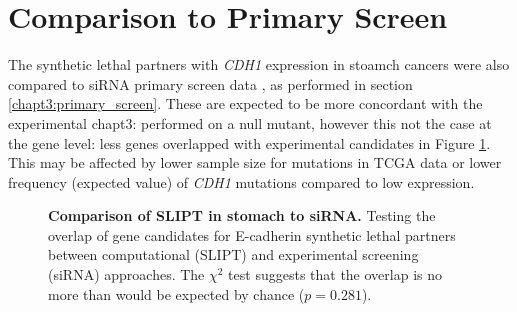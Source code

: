 
\FloatBarrier

\section{Comparison to Primary Screen} \label{appendix:compare_exprSL_genes_stad}

The synthetic lethal partners with \textit{CDH1} expression in stoamch cancers were also compared to siRNA primary screen data \citep{Telford2015}, as performed in section \ref{chapt3:primary_screen}. These are expected to be more concordant with the experimental chapt3: performed on a null mutant, however this not the case at the gene level: less genes overlapped with experimental candidates in Figure \ref{fig:Venn_allgenes_stad}. This may be affected by lower sample size for mutations in TCGA data or lower frequency (expected value) of \textit{CDH1} mutations compared to low expression. 



\begin{figure}[!ht]
\begin{mdframed}
  \centering
    \caption[Comparison of SLIPT in stomach to siRNA]{\small \textbf{Comparison of SLIPT in stomach to siRNA.} Testing the overlap of gene candidates for E-cadherin synthetic lethal partners between computational (SLIPT) and experimental screening (siRNA) approaches. The $\chi^2$ test suggests that the overlap is no more than would be expected by chance ($p = 0.281$). %
}
\label{fig:Venn_allgenes_stad}
\end{mdframed}
\end{figure}


\FloatBarrier

